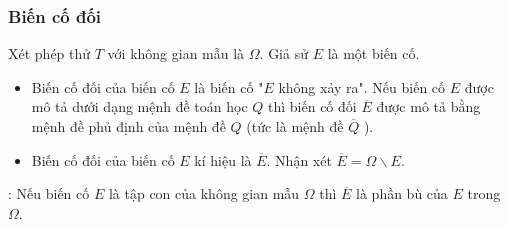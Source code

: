 \subsubsection{Biến cố đối}
Xét phép thử $T$  với không gian mẫu là  $\Omega$. Giả sử $E$ là một biến cố.
\begin{boxkn}
	\begin{itemize}
		\item [$\bullet$] Biến cố đối của biến cố $E$ là biến cố "$E$ không xảy ra". Nếu biến cố $E$ được mô tả dưới dạng mệnh đề toán học $Q$ thì biến cố đối $\overline{E}$ được mô tả bằng mệnh đề phủ định của mệnh đề $Q$ (tức là mệnh đề $\overline{Q}$ ).
		\item [$\bullet$] Biến cố đối của biến cố $E$ kí hiệu là $\overline{E}$. Nhận xét $\overline{E}=\Omega \backslash E$.
	\end{itemize}
\end{boxkn}
: Nếu biến cố $E$ là tập con của không gian mẫu $\Omega$ thì $\overline{E}$ là phần bù của $E$ trong $\Omega$.
